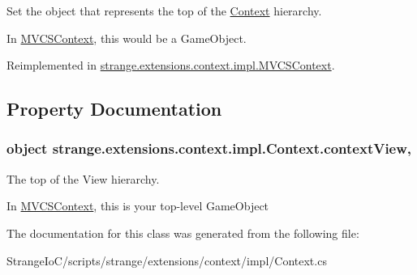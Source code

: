 Set the object that represents the top of the \hyperlink{classstrange_1_1extensions_1_1context_1_1impl_1_1_context}{Context} hierarchy. 

In \hyperlink{classstrange_1_1extensions_1_1context_1_1impl_1_1_m_v_c_s_context}{M\-V\-C\-S\-Context}, this would be a Game\-Object. 

Reimplemented in \hyperlink{classstrange_1_1extensions_1_1context_1_1impl_1_1_m_v_c_s_context_aecc258bb5f3d3edd1a3f93ca33a2ce4e}{strange.\-extensions.\-context.\-impl.\-M\-V\-C\-S\-Context}.



\subsection{Property Documentation}
\hypertarget{classstrange_1_1extensions_1_1context_1_1impl_1_1_context_a6403b0233cce89fdf38d810c740795c2}{
\subsubsection[{context\-View}]{\setlength{\rightskip}{0pt plus 5cm}object strange.\-extensions.\-context.\-impl.\-Context.\-context\-View\hspace{0.3cm}{\ttfamily [get]}, {\ttfamily [set]}}}\label{classstrange_1_1extensions_1_1context_1_1impl_1_1_context_a6403b0233cce89fdf38d810c740795c2}


The top of the View hierarchy. 

In \hyperlink{classstrange_1_1extensions_1_1context_1_1impl_1_1_m_v_c_s_context}{M\-V\-C\-S\-Context}, this is your top-\/level Game\-Object 

The documentation for this class was generated from the following file\-:\begin{DoxyCompactItemize}
\item 
Strange\-Io\-C/scripts/strange/extensions/context/impl/Context.\-cs\end{DoxyCompactItemize}
